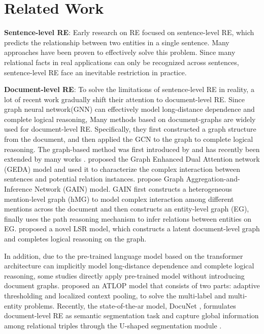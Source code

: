 \documentclass[11pt]{article}
\begin{document}
\section{Related Work}
\textbf{Sentence-level RE}: 
Early research on RE focused on sentence-level RE, which predicts the relationship between two entities in a single sentence.
Many approaches \cite{c:140,c:141,c:143,c:144,c:145,c:146,c:147,c:148,c:149,c:150} have been proven to effectively solve this problem.
Since many relational facts in real applications can only be recognized across sentences, sentence-level RE face an inevitable restriction in practice.

\noindent \textbf{Document-level RE}: 
To solve the limitations of sentence-level RE in reality, a lot of recent work gradually shift their attention to document-level RE.
Since graph neural network(GNN) can effectively model long-distance dependence and complete logical reasoning, Many methods based on document-graphs are widely used for document-level RE.
Specifically, they first constructed a graph structure from the document, and then applied the GCN \cite{c:110,c:121} to the graph to complete logical reasoning.
The graph-based method was first introduced by \cite{c:152} and has recently been extended by many works \cite{c:107,c:130,c:139,c:151,c:108,c:106,c:105,c:134}.
\cite{c:130} proposed the Graph Enhanced Dual Attention network (GEDA) model and used it to characterize the complex interaction between sentences and potential relation instances.
\cite{c:105} propose Graph Aggregation-and-Inference Network (GAIN) model.
GAIN first constructs a heterogeneous mention-level graph (hMG) to model complex interaction among different mentions across the document and then constructs an entity-level graph (EG), finally uses the path reasoning mechanism to infer relations between entities on EG.
\cite{c:106} proposed a novel LSR model, which constructs a latent document-level graph and completes logical reasoning on the graph.

In addition, due to the pre-trained language model based on the transformer architecture can implicitly model long-distance dependence and complete logical reasoning, some studies \cite{c:111,c:112,c:135} directly apply pre-trained model without introducing document graphs.
\cite{c:112} proposed an ATLOP model that consists of two parts: adaptive thresholding and localized context pooling, to solve the multi-label and multi-entity problems.
Recently, the state-of-the-ar model, DocuNet \cite{c:113},  formulates document-level RE as semantic segmentation task and capture  global information among relational triples through the U-shaped segmentation module \cite{c:115}.
\end{document}
